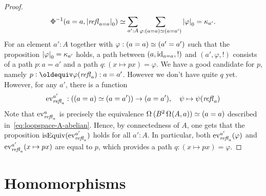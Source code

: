 \begin{proof}
\begin{displaymath}
    \Phi^{-1}(a=a,{\lvert\mathop{\mathit{refl}_{a=a}}\rvert}_0) \simeq \sum_{a':A}
    \sum_{\varphi : (a=a) \simeq (a=a')}{\lvert\varphi\rvert}_0 = \kappa_{a'}.
  \end{displaymath}
  For an element $a':A$ together with $\varphi: (a=a) \simeq (a'=a')$
  such that the proposition ${\lvert\varphi\rvert}_0 = \kappa_{a'}$ holds, a
  path between $(a,\mathord{\mathrm{id}}_{a=a},!)$ and $(a',\varphi,!)$ consists of a
  path $p:a=a'$ and a path $q:(x\mapsto p x) = \varphi$. We have a
  good candidate for $p$, namely $p\defequi \varphi(\refl
  a):a=a'$. However we don't have quite $q$ yet. However, for any
  $a'$, there is a function
  \begin{displaymath}
    \mathrm{ev}_{\mathop{\mathit{refl}_{a}}}^{a'} : ((a=a)\simeq (a=a')) \to (a=a'),\quad \psi \mapsto \psi(\mathop{\mathit{refl}_{a}}) 
  \end{displaymath}
  Note that $\mathrm{ev}_{\mathop{\mathit{refl}_{a}}}^{a}$ is precisely the equivalence
  $\loopspace{(\BB\loopspace(A,a))}\weq (a=a)$ described
  in~\cref{eq:loopspace-A-abelian}. Hence, by connectedness of $A$,
  one gets that the proposition $\mathrm{isEquiv}(\mathrm{ev}_{\mathop{\mathit{refl}_{a}}}^{a'})$ holds for
  all $a':A$. In particular, both $\mathrm{ev}_{\mathop{\mathit{refl}_{a}}}^{a'}(\varphi)$ and
  $\mathrm{ev}_{\mathop{\mathit{refl}_{a}}}^{a'}(x\mapsto px)$ are equal to $p$, which provides a
  path $q:(x\mapsto px)=\varphi$.
\end{proof}


\section{Homomorphisms}
\label{sec:homomorphisms}



